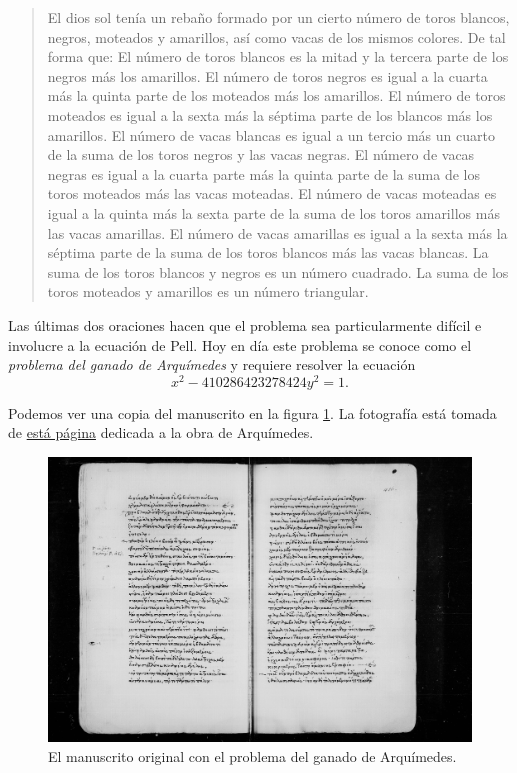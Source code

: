 \begin{quote}
	El dios sol tenía un rebaño formado por un cierto número de toros blancos,
	negros, moteados y amarillos, así como vacas de los mismos colores. De tal
	forma que: El número de toros blancos es la mitad y la tercera parte de los
	negros más los amarillos.  El número de toros negros es igual a la cuarta
	más la quinta parte de los moteados más los amarillos.  El número de toros
	moteados es igual a la sexta más la séptima parte de los blancos más los
	amarillos.  El número de vacas blancas es igual a un tercio más un cuarto
	de la suma de los toros negros y las vacas negras.  El número de vacas
	negras es igual a la cuarta parte más la quinta parte de la suma de los
	toros moteados más las vacas moteadas.  El número de vacas moteadas es
	igual a la quinta más la sexta parte de la suma de los toros amarillos más
	las vacas amarillas.  El número de vacas amarillas es igual a la sexta más
	la séptima parte de la suma de los toros blancos más las vacas blancas. La
	suma de los toros blancos y negros es un número cuadrado.  La suma de los
	toros moteados y amarillos es un número triangular.
\end{quote}

Las últimas dos oraciones hacen que el problema sea particularmente difícil e
involucre a la ecuación de Pell.  Hoy en día este problema se conoce como el
\emph{problema del ganado de Arquímedes} y requiere resolver la ecuación 
\[
	x^2- 410286423278424y^2=1.
\]

Podemos ver una copia del manuscrito en la figura \ref{fig:cattle}. 
La fotografía está tomada de \href{https://www.math.nyu.edu/~crorres/Archimedes/contents.html}{está página} 
dedicada a la obra de Arquímedes. 

\begin{figure}[h]
   \centering
   \includegraphics[scale=0.15]{images/cattle.jpeg}
   \caption{El manuscrito original con el problema del ganado de Arquímedes.}
   \label{fig:cattle}
\end{figure}

